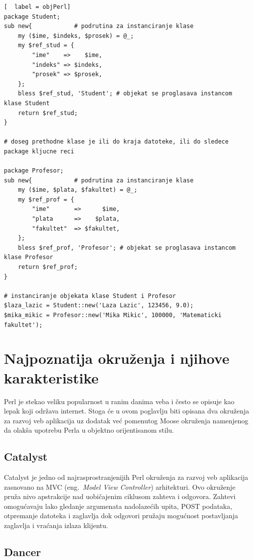 \documentclass[a4paper]{article}
\begin{document}
\begin{lstlisting}[  label = objPerl]
package Student;    
sub new{            # podrutina za instanciranje klase
    my ($ime, $indeks, $prosek) = @_;
    my $ref_stud = {
        "ime"    =>    $ime,
        "indeks" => $indeks,
        "prosek" => $prosek,
    };
    bless $ref_stud, 'Student'; # objekat se proglasava instancom klase Student
    return $ref_stud;
}

# doseg prethodne klase je ili do kraja datoteke, ili do sledece package kljucne reci

package Profesor;
sub new{            # podrutina za instanciranje klase
    my ($ime, $plata, $fakultet) = @_;
    my $ref_prof = {
        "ime"       =>      $ime,
        "plata      =>    $plata,
        "fakultet"  => $fakultet,
    };
    bless $ref_prof, 'Profesor'; # objekat se proglasava instancom klase Profesor
    return $ref_prof;
}

# instanciranje objekata klase Student i Profesor
$laza_lazic = Student::new('Laza Lazic', 123456, 9.0);
$mika_mikic = Profesor::new('Mika Mikic', 100000, 'Matematicki fakultet');

\end{lstlisting}


\section{Najpoznatija okruženja i njihove karakteristike}

Perl je stekao veliku popularnost u ranim danima veba i često se opisuje kao lepak koji održava internet. Stoga će u ovom poglavlju biti opisana dva okruženja za razvoj veb aplikacija uz dodatak već pomenutog Moose okruženja namenjenog da olakša upotrebu Perla u objektno orijentisanom stilu. 

\subsection{Catalyst}

Catalyst je jedno od najrasprostranjenijih Perl okruženja za razvoj veb aplikacija zasnovano na MVC (eng.~{\em Model View Controller}) arhitekturi. Ovo okruženje pruža nivo apstrakcije nad uobičajenim ciklusom zahteva i odgovora. Zahtevi omogućavaju lako gledanje argumenata nadolazećih upita, POST podataka, otpremanje datoteka i zaglavlja dok odgovori pružaju mogućnost postavljanja zaglavlja i vraćanja izlaza klijentu. 

\subsection{Dancer}
\end{document}
